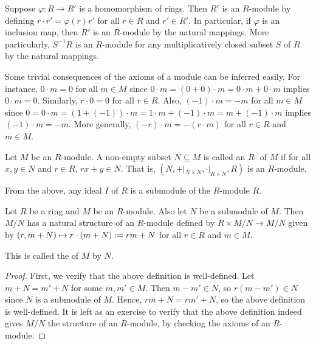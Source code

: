 \begin{example}
    Suppose $\varphi:R \to R'$ is a homomorphism of rings. Then $R'$ is an $R$-module by defining $r \cdot r' = \varphi(r)r'$ for all $r \in R$ and $r' \in R'$. In particular, if $\varphi$ is an inclusion map, then $R'$ is an $R$-module by the natural mappings. More particularly, $S^{-1}R$ is an $R$-module for any multiplicatively closed subset $S$ of $R$ by the natural mappings.
\end{example}

Some trivial consequences of the axioms of a module can be inferred easily. For instance, $0 \cdot m = 0$ for all $m \in M$ since $0 \cdot m = (0 + 0) \cdot m = 0 \cdot m + 0 \cdot m$ implies $0 \cdot m = 0$. Similarly, $r \cdot 0 = 0$ for all $r \in R$. Also, $(-1) \cdot m = -m$ for all $m \in M$ since $0 = 0 \cdot m = (1 + (-1)) \cdot m = 1 \cdot m + (-1) \cdot m = m + (-1) \cdot m$ implies $(-1) \cdot m = -m$. More generally, $(-r) \cdot m = -(r \cdot m)$ for all $r \in R$ and $m \in M$.

\begin{definition}
    Let $M$ be an $R$-module. A non-empty subset $N \subseteq M$ is called an $R$- of $M$ if for all $x,y \in N$ and $r \in R$, $rx + y \in N$. That is, $(N, +|_{N \times N}, \cdot|_{R \times N}, R)$ is an $R$-module.
\end{definition}

From the above, any ideal $I$ of $R$ is a submodule of the $R$-module $R$.

\begin{proposition}
    Let $R$ be a ring and $M$ be an $R$-module. Also let $N$ be a submodule of $M$. Then $M/N$ has a natural structure of an $R$-module defined by $R \times M/N \to M/N$ given by $(r,m+N) \mapsto r \cdot (m+N) \vcentcolon= rm+N$ for all $r \in R$ and $m \in M$.
\end{proposition}

This is called the  of $M$ by $N$.

\begin{proof}
    First, we verify that the above definition is well-defined. Let $m + N = m' + N$ for some $m,m' \in M$. Then $m - m' \in N$, so $r(m - m') \in N$ since $N$ is a submodule of $M$. Hence, $rm + N = rm' + N$, so the above definition is well-defined. It is left as an exercise to verify that the above definition indeed gives $M/N$ the structure of an $R$-module, by checking the axioms of an $R$-module.
\end{proof}

